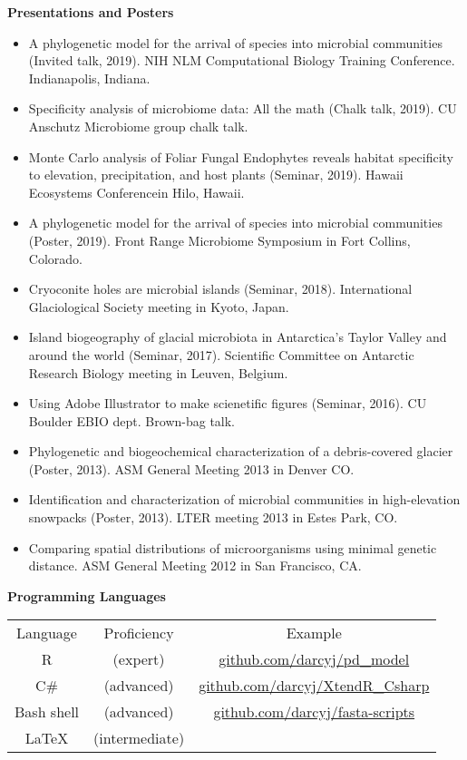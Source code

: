 \documentclass{article}
\begin{document}
\vspace{3mm}
{\large  \textbf{Presentations and Posters}}
\begin{itemize}[noitemsep,topsep=0pt, leftmargin=5mm]
  \item A phylogenetic model for the arrival of species into microbial communities (Invited talk, 2019). NIH NLM Computational Biology Training Conference. Indianapolis, Indiana.
  \item Specificity analysis of microbiome data: All the math (Chalk talk, 2019). CU Anschutz Microbiome group chalk talk.
  \item Monte Carlo analysis of Foliar Fungal Endophytes reveals habitat specificity to elevation, precipitation, and host plants (Seminar, 2019). Hawaii Ecosystems Conferencein  Hilo, Hawaii.
  \item A phylogenetic model for the arrival of species into microbial communities (Poster, 2019). Front Range Microbiome Symposium in Fort Collins, Colorado.
  \item Cryoconite holes are microbial islands (Seminar, 2018). International Glaciological Society meeting in Kyoto, Japan.
  \item Island biogeography of glacial microbiota in Antarctica’s Taylor Valley and around the world (Seminar, 2017). Scientific Committee on Antarctic Research Biology meeting in Leuven, Belgium.
  \item Using Adobe Illustrator to make scienetific figures (Seminar, 2016). CU Boulder EBIO dept. Brown-bag talk.
  \item Phylogenetic and biogeochemical characterization of a debris-covered glacier (Poster, 2013). ASM General Meeting 2013 in Denver CO.
  \item Identification and characterization of microbial communities in high-elevation snowpacks (Poster, 2013). LTER meeting 2013 in Estes Park, CO.
  \item Comparing spatial distributions of microorganisms using minimal genetic distance. ASM General Meeting 2012 in San Francisco, CA.
\end{itemize}
\vspace{3mm}
{\large  \textbf{Programming Languages}}
\\\begin{tabular}{c c c}
  Language & Proficiency & Example\\
  R & (expert) & \href{https://github.com/darcyj/pd_model}{github.com/darcyj/pd\_model}\\
  C\# & (advanced) & \href{https://github.com/darcyj/XtendR_Csharp}{github.com/darcyj/XtendR\_Csharp}\\
  Bash shell & (advanced) & \href{https://github.com/darcyj/fasta-scripts}{github.com/darcyj/fasta-scripts}\\
  \LaTeX & (intermediate) & \href{}{}\\

\end{tabular}
\end{document}
